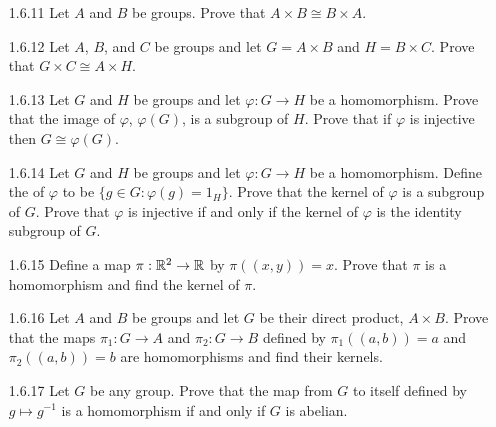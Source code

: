 \begin{enumerate}
   \item[1.6.11]  Let $A$ and $B$ be groups. Prove that
                  $A \times B \cong B\times A$.
   \item[1.6.12]  Let $A$, $B$, and $C$ be groups and let $G = A \times B$ and
                  $H = B \times C$. Prove that $G \times C \cong A \times H$.
   \item[1.6.13]  Let $G$ and $H$ be groups and let $\varphi : G \rightarrow H$
                  be a homomorphism. Prove that the image of $\varphi$,
                  $\varphi(G)$, is a subgroup of $H$. Prove that if $\varphi$ is
                  injective then $G \cong \varphi(G)$.
   \item[1.6.14]  Let $G$ and $H$ be groups and let $\varphi : G \rightarrow H$
                  be a homomorphism. Define the  of $\varphi$ to be
                  $\{g \in G : \varphi(g) = 1_H\}$. Prove that the kernel of
                  $\varphi$ is a subgroup of $G$. Prove that $\varphi$ is
                  injective if and only if the kernel of $\varphi$ is the
                  identity subgroup of $G$.
   \item[1.6.15]  Define a map $\pi : \mathbb{R}^2 \rightarrow \mathbb{R}$ by $\pi((x, y)) = x$.
                  Prove that $\pi$ is a homomorphism and find the kernel of
                  $\pi$.
   \item[1.6.16]  Let $A$ and $B$ be groups and let $G$ be their direct product,
                  $A \times B$. Prove that the maps $\pi_1 : G \rightarrow A$
                  and $\pi_2 : G \rightarrow B$ defined by $\pi_1((a, b)) = a$
                  and $\pi_2((a, b)) = b$ are homomorphisms and find their
                  kernels.
   \item[1.6.17]  Let $G$ be any group. Prove that the map from $G$ to itself
                  defined by $g \mapsto g^{-1}$ is a homomorphism if and only if
                  $G$ is abelian.

\end{enumerate}
